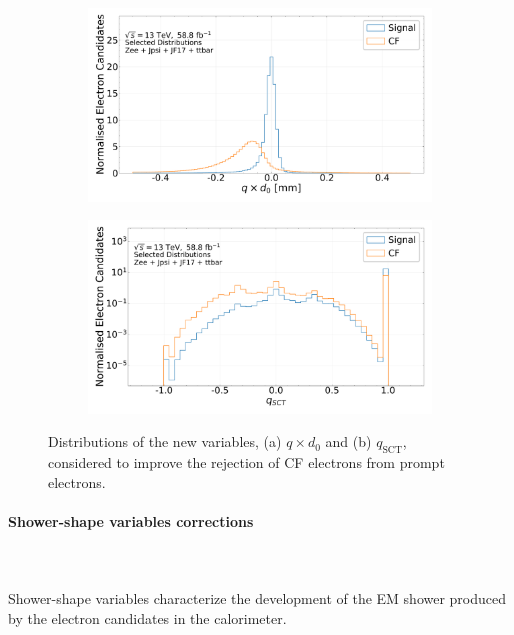 \begin{figure}[htbp]
  \centering
  \begin{subfigure}[b]{0.49\textwidth}
      \includegraphics[width=\textwidth]{images/selection_MultiClass_qd0_train.pdf}
      \caption{}
  \end{subfigure}
  \begin{subfigure}[b]{0.49\textwidth}
      \includegraphics[width=\textwidth]{images/selection_MultiClass_sctweightedcharge_train.pdf}
      \caption{}
  \end{subfigure}
  \caption{Distributions of the new variables, (a) $q \times d_{0}$ and (b) $q_{\text{SCT}}$, considered to improve the rejection of CF electrons from prompt electrons.}
  \label{fig:cf_plots}
\end{figure}

\paragraph{Shower-shape variables corrections} \mbox{}\\
\\
Shower-shape variables characterize the development of the EM shower produced by the electron candidates in the calorimeter.

